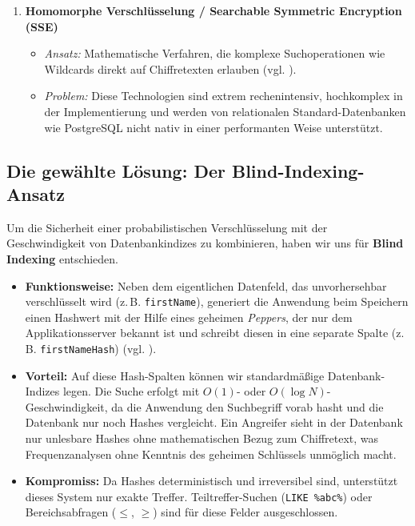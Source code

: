 \begin{enumerate}
    \item \textbf{Homomorphe Verschlüsselung / Searchable Symmetric Encryption (SSE)}
    \begin{itemize}
        \item \textit{Ansatz:} Mathematische Verfahren, die komplexe Suchoperationen wie Wildcards direkt auf Chiffretexten erlauben (vgl. \cite{curtmola2006searchable}).
        \item \textit{Problem:} Diese Technologien sind extrem rechenintensiv, hochkomplex in der Implementierung und werden von relationalen Standard-Datenbanken wie PostgreSQL nicht nativ in einer performanten Weise unterstützt.
    \end{itemize}
\end{enumerate}

\subsection{Die gewählte Lösung: Der Blind-Indexing-Ansatz}

Um die Sicherheit einer probabilistischen Verschlüsselung mit der Geschwindigkeit von Datenbankindizes zu kombinieren, haben wir uns für \textbf{Blind Indexing} entschieden.

\begin{itemize}
    \item \textbf{Funktionsweise:} Neben dem eigentlichen Datenfeld, das unvorhersehbar verschlüsselt wird (z.\,B. \texttt{firstName}), generiert die Anwendung beim Speichern einen Hashwert mit der Hilfe eines geheimen \textit{Peppers}, der nur dem Applikationsserver bekannt ist und schreibt diesen in eine separate Spalte (z.\,B. \texttt{firstNameHash}) (vgl. \cite{vialar2024blindextee}).
    \item \textbf{Vorteil:} Auf diese Hash-Spalten können wir standardmäßige Datenbank-Indizes legen. Die Suche erfolgt mit $O(1)$- oder $O(\log N)$-Geschwindigkeit, da die Anwendung den Suchbegriff vorab hasht und die Datenbank nur noch Hashes vergleicht. Ein Angreifer sieht in der Datenbank nur unlesbare Hashes ohne mathematischen Bezug zum Chiffretext, was Frequenzanalysen ohne Kenntnis des geheimen Schlüssels unmöglich macht.
    \item \textbf{Kompromiss:} Da Hashes deterministisch und irreversibel sind, unterstützt dieses System nur exakte Treffer. 
    Teiltreffer-Suchen (\texttt{LIKE \%abc\%}) oder Bereichsabfragen ($\le$, $\ge$) sind für diese Felder ausgeschlossen.
\end{itemize}

